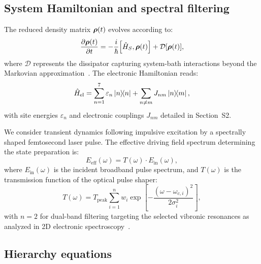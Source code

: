 \documentclass[11pt,a4paper]{article}
\begin{document}
\subsection{System Hamiltonian and spectral filtering}

The reduced density matrix $\vb*{\rho}(t)$ evolves according to:
\begin{equation}
\pdv{\vb*{\rho}(t)}{t} = -\frac{i}{\hbar}\comm{\hat{H}_S}{\vb*{\rho}(t)} + \mathcal{D}[\vb*{\rho}(t)],
\label{eq:SI_master_eq}
\end{equation}
where $\mathcal{D}$ represents the dissipator capturing system-bath interactions beyond the Markovian approximation~\cite{Tanimura1989}. The electronic Hamiltonian reads:
\begin{equation}
\hat{H}_{\mathrm{el}} = \sum_{n=1}^{7} \varepsilon_n \dyad{n} + \sum_{n \neq m} J_{nm} \dyad{n}{m},
\label{eq:SI_excitonic_hamiltonian}
\end{equation}
with site energies $\varepsilon_n$ and electronic couplings $J_{nm}$ detailed in Section~S2.

We consider transient dynamics following impulsive excitation by a spectrally shaped femtosecond laser pulse. The effective driving field spectrum determining the state preparation is:
\begin{equation}
E_{\mathrm{eff}}(\omega) = T(\omega) \cdot E_{\mathrm{in}}(\omega),
\label{eq:SI_filtered_spectral_density}
\end{equation}
where $E_{\mathrm{in}}(\omega)$ is the incident broadband pulse spectrum, and $T(\omega)$ is the transmission function of the optical pulse shaper:
\begin{equation}
T(\omega) = T_{\mathrm{peak}} \sum_{i=1}^{n} w_i \exp\!\left[-\frac{(\omega - \omega_{c,i})^2}{2\sigma_i^2}\right],
\label{eq:SI_transmission_function}
\end{equation}
with $n=2$ for dual-band filtering targeting the selected vibronic resonances as analyzed in 2D electronic spectroscopy~\cite{Cho2005}.

\subsection{Hierarchy equations}
\end{document}
